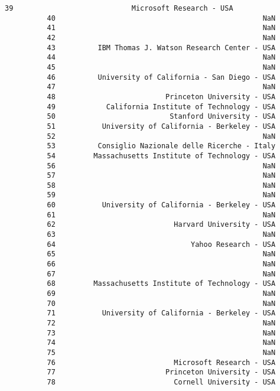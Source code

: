 \documentclass[11pt]{article}
\begin{document}
\begin{Verbatim}[commandchars=\\\{\}]
          39                            Microsoft Research - USA   
          40                                                 NaN   
          41                                                 NaN   
          42                                                 NaN   
          43          IBM Thomas J. Watson Research Center - USA   
          44                                                 NaN   
          45                                                 NaN   
          46          University of California - San Diego - USA   
          47                                                 NaN   
          48                          Princeton University - USA   
          49            California Institute of Technology - USA   
          50                           Stanford University - USA   
          51           University of California - Berkeley - USA   
          52                                                 NaN   
          53          Consiglio Nazionale delle Ricerche - Italy   
          54         Massachusetts Institute of Technology - USA   
          56                                                 NaN   
          57                                                 NaN   
          58                                                 NaN   
          59                                                 NaN   
          60           University of California - Berkeley - USA   
          61                                                 NaN   
          62                            Harvard University - USA   
          63                                                 NaN   
          64                                Yahoo Research - USA   
          65                                                 NaN   
          66                                                 NaN   
          67                                                 NaN   
          68         Massachusetts Institute of Technology - USA   
          69                                                 NaN   
          70                                                 NaN   
          71           University of California - Berkeley - USA   
          72                                                 NaN   
          73                                                 NaN   
          74                                                 NaN   
          75                                                 NaN   
          76                            Microsoft Research - USA   
          77                          Princeton University - USA   
          78                            Cornell University - USA   

\end{Verbatim}
\end{document}
